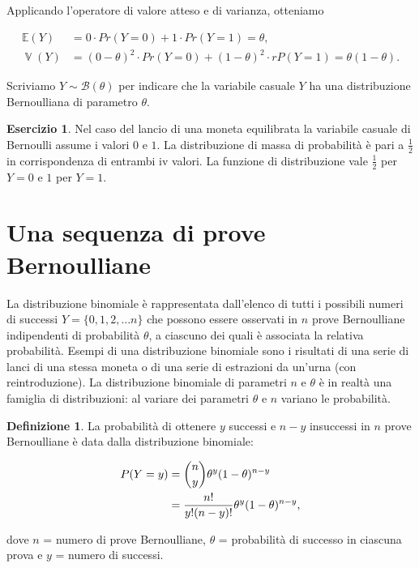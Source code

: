 \documentclass[
  11pt,
]{krantz}
\newcommand{\E}{\mathbb{E}} %
\DeclareMathOperator{\Var}{\mathbb{V}} %
\theoremstyle{definition}
\newtheorem{definition}{Definizione}[chapter]
\theoremstyle{definition}
\theoremstyle{definition}
\newtheorem{exercise}{Esercizio}[chapter]
\theoremstyle{definition}
\theoremstyle{remark}
\begin{document}
Applicando l'operatore di valore atteso e di varianza, otteniamo

\begin{align}
\E(Y) &= 0 \cdot Pr(Y=0) + 1 \cdot Pr(Y=1) = \theta, \\
\Var(Y) &= (0 - \theta)^2 \cdot Pr(Y=0) + (1 - \theta)^2 \cdot rP(Y=1) = \theta(1-\theta).
\label{eq:ev-var-bern}
\end{align}

Scriviamo \(Y \sim \mathcal{B}(\theta)\) per indicare che la variabile casuale \(Y\) ha una distribuzione Bernoulliana di parametro \(\theta\).

\begin{exercise}
Nel caso del lancio di una moneta equilibrata la variabile casuale di Bernoulli assume i valori \(0\) e \(1\). La distribuzione di massa di probabilità è pari a \(\frac{1}{2}\) in corrispondenza di entrambi iv valori. La funzione di distribuzione vale \(\frac{1}{2}\) per \(Y = 0\) e \(1\) per \(Y = 1\).
\end{exercise}

\hypertarget{una-sequenza-di-prove-bernoulliane}{%
\section{Una sequenza di prove Bernoulliane}\label{una-sequenza-di-prove-bernoulliane}}

La distribuzione binomiale è rappresentata dall'elenco di tutti i possibili numeri di successi \(Y = \{0, 1, 2, \dots n\}\) che possono essere osservati in \(n\) prove Bernoulliane indipendenti di probabilità \(\theta\), a ciascuno dei quali è associata la relativa probabilità. Esempi di una distribuzione binomiale sono i risultati di una serie di lanci di una stessa moneta o di una serie di estrazioni da un'urna (con reintroduzione). La distribuzione binomiale di parametri \(n\) e \(\theta\) è in realtà una famiglia di distribuzioni: al variare dei parametri \(\theta\) e \(n\) variano le probabilità.

\begin{definition}
La probabilità di ottenere \(y\) successi e \(n-y\) insuccessi in \(n\) prove Bernoulliane è data dalla distribuzione binomiale:

\begin{align}
P(Y=y) &= \binom{n}{y} \theta^{y} (1-\theta)^{n-y} \notag \\
&= \frac{n!}{y!(n-y)!} \theta^{y} (1-\theta)^{n-y}, 
\label{eq:binomialdistribution}
\end{align}

dove \(n\) = numero di prove Bernoulliane, \(\theta\) = probabilità di successo in ciascuna prova e \(y\) = numero di successi.
\end{definition}
\end{document}
